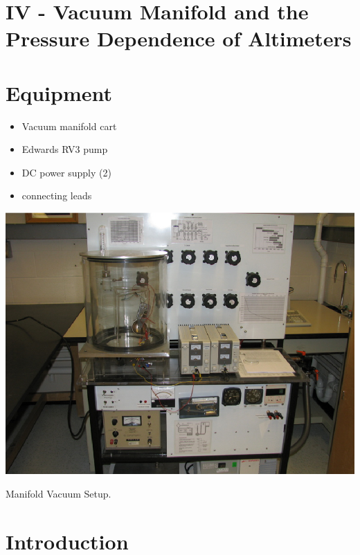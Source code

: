 \section{IV - Vacuum Manifold and the Pressure Dependence of Altimeters}

\section{Equipment}

\begin{minipage}[t]{0.5\textwidth}
\begin{itemize}[noitemsep]
\item Vacuum manifold cart
\item Edwards RV3 pump
\end{itemize}
\end{minipage}
\begin{minipage}[t]{0.5\textwidth}
\begin{itemize}[noitemsep]
\item DC power supply (2)
\item connecting leads
\end{itemize}
\end{minipage}

\begin{marginfigure}
\includegraphics{Manifold-System.eps}
\caption{Manifold Vacuum Setup.}
\label{fig:VACsetup4}
\end{marginfigure}

\section{Introduction}

